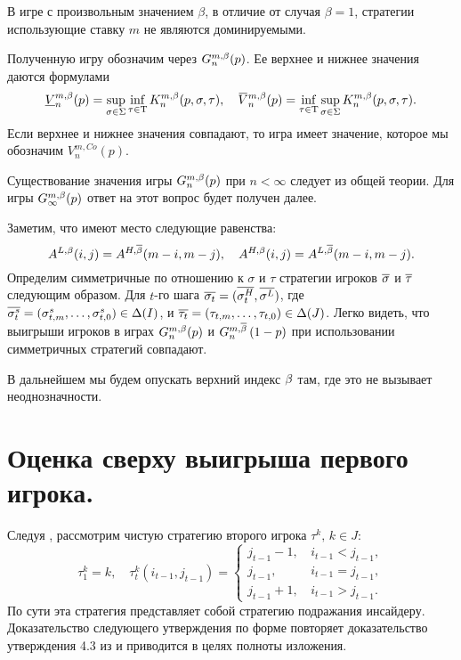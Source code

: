 {\begin{remark}
  В игре с произвольным значением $\beta$, в отличие от случая $\beta = 1$, стратегии использующие ставку $m$ не являются доминируемыми.
\end{remark}

Полученную игру обозначим через $G^{m,\Co}_n(p)$. Ее верхнее и нижнее значения даются формулами
\begin{equation*}
  \underline{V}^{m,\Co}_n(p) = \sup_{\sigma \in \Sigma} \inf_{\tau \in \Tau}
  K^{m,\Co}_n(p, \sigma, \tau), \quad
  \overbar{V}^{m,\Co}_n(p) = \inf_{\tau \in \Tau} \sup_{\sigma \in \Sigma}
  K^{m,\Co}_n(p, \sigma, \tau).
\end{equation*}
Если верхнее и нижнее значения совпадают, то игра имеет значение, которое мы обозначим $V^{m,Co}_n(p)$.

\begin{remark}
  Существование значения игры $G^{m,\Co}_n(p)$ при $n < \infty$ следует из общей теории.
  Для игры $G^{m,\Co}_\infty(p)$ ответ на этот вопрос будет получен далее.
\end{remark}

Заметим, что имеют место следующие равенства:
\begin{equation*}
  A^{L,\Co}(i, j) = A^{H,\DCo}(m-i, m-j), \quad
  A^{H,\Co}(i, j) = A^{L,\DCo}(m-i, m-j).
\end{equation*}
Определим симметричные по отношению к $\sigma$ и $\tau$ стратегии игроков
$\symm{\sigma}$ и $\symm{\tau}$ следующим образом. 
Для $t$-го шага
 $\symm{\sigma_t} = (\symm{\sigma^H_t}, \symm{\sigma^L})$, где
$\symm{\sigma^s_t}=(\sigma^s_{t,m},\ldots,\sigma^s_{t,0}) \in \Delta(I)$, и
$\symm{\tau_t} = (\tau_{t,m},\ldots,\tau_{t,0}) \in \Delta(J)$.
Легко видеть, что выигрыши игроков в играх $G^{m,\Co}_n(p)$ и $\symmGameExpression[n]{1-p}$ при использовании симметричных стратегий совпадают.

В дальнейшем мы будем опускать верхний индекс $\Co$ там, где это не вызывает неоднозначности.

\section{Оценка сверху выигрыша первого игрока.}\label{ch1:upper-bound}
Следуя \cite{domansky07}, рассмотрим чистую стратегию второго игрока $\tau^k, \, k \in J$:
\[
  \tau^k_1 = k, \quad \tau^k_t(i_{t-1}, j_{t-1}) = \begin{cases}
    j_{t-1} - 1, & \, i_{t-1} < j_{t-1}, \\
    j_{t-1},     & \, i_{t-1} = j_{t-1}, \\
    j_{t-1} + 1, & \, i_{t-1} > j_{t-1}.
  \end{cases}
\]
По сути эта стратегия представляет собой стратегию подражания инсайдеру.
Доказательство следующего утверждения по форме повторяет доказательство утверждения 4.3 из \cite{domansky07} и приводится в целях полноты изложения.

}
